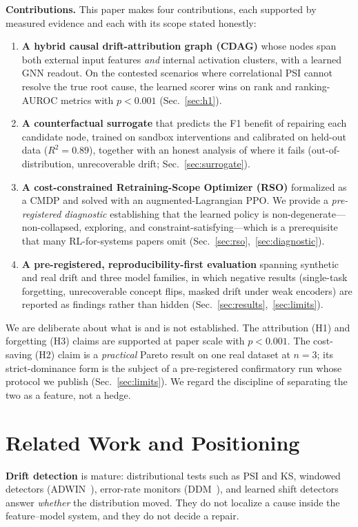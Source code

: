 \documentclass[conference]{IEEEtran}
\begin{document}
\textbf{Contributions.} This paper makes four contributions, each
supported by measured evidence and each with its scope stated honestly:
\begin{enumerate}
\item \textbf{A hybrid causal drift-attribution graph (CDAG)} whose nodes
span both external input features \emph{and} internal activation clusters,
with a learned GNN readout. On the contested scenarios where correlational
PSI cannot resolve the true root cause, the learned scorer wins on rank
and ranking-AUROC metrics with $p<0.001$ (Sec.~\ref{sec:h1}).
\item \textbf{A counterfactual surrogate} that predicts the F1 benefit of
repairing each candidate node, trained on sandbox interventions and
calibrated on held-out data ($R^2=0.89$), together with an honest analysis
of where it fails (out-of-distribution, unrecoverable drift; Sec.~\ref{sec:surrogate}).
\item \textbf{A cost-constrained Retraining-Scope Optimizer (RSO)}
formalized as a CMDP and solved with an augmented-Lagrangian PPO. We
provide a \emph{pre-registered diagnostic} establishing that the learned
policy is non-degenerate---non-collapsed, exploring, and
constraint-satisfying---which is a prerequisite that many RL-for-systems
papers omit (Sec.~\ref{sec:rso},~\ref{sec:diagnostic}).
\item \textbf{A pre-registered, reproducibility-first evaluation}
spanning synthetic and real drift and three model families, in which
negative results (single-task forgetting, unrecoverable concept flips,
masked drift under weak encoders) are reported as findings rather than
hidden (Sec.~\ref{sec:results},~\ref{sec:limits}).
\end{enumerate}

We are deliberate about what is and is not established. The attribution
(H1) and forgetting (H3) claims are supported at paper scale with
$p<0.001$. The cost-saving (H2) claim is a \emph{practical} Pareto result
on one real dataset at $n{=}3$; its strict-dominance form is the subject
of a pre-registered confirmatory run whose protocol we publish
(Sec.~\ref{sec:limits}). We regard the discipline of separating the two as
a feature, not a hedge.

\section{Related Work and Positioning}\label{sec:related}
\textbf{Drift detection} is mature: distributional tests such as PSI and
KS, windowed detectors (ADWIN~\cite{bifet2007adwin}), error-rate monitors
(DDM~\cite{gama2004ddm}), and learned shift detectors~\cite{rabanser2019failing}
answer \emph{whether} the distribution moved. They do not localize a cause
inside the feature--model system, and they do not decide a repair.
\end{document}
